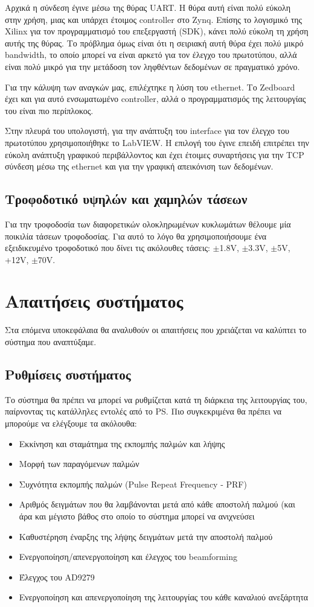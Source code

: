 \documentclass[12pt,a4paper]{book}
\begin{document}
Αρχικά η σύνδεση έγινε μέσω της θύρας UART. Η θύρα αυτή είναι πολύ εύκολη στην χρήση, μιας και υπάρχει έτοιμος controller στο Zynq. Επίσης το λογισμικό της Xilinx για τον προγραμματισμό του επεξεργαστή (SDK), κάνει πολύ εύκολη τη χρήση αυτής της θύρας. Το πρόβλημα όμως είναι ότι η σειριακή αυτή θύρα έχει πολύ μικρό bandwidth, το οποίο μπορεί να είναι αρκετό για τον έλεγχο του πρωτοτύπου, αλλά είναι πολύ μικρό για την μετάδοση τον ληφθέντων δεδομένων σε πραγματικό χρόνο.

Για την κάλυψη των αναγκών μας, επιλέχτηκε η λύση του ethernet. Το Zedboard έχει και για αυτό ενσωματωμένο controller, αλλά ο προγραμματισμός της λειτουργίας του είναι πιο περίπλοκος. 

Στην πλευρά του υπολογιστή, για την ανάπτυξη του interface για τον έλεγχο του πρωτοτύπου χρησιμοποιήθηκε το LabVIEW. Η επιλογή του έγινε επειδή επιτρέπει την εύκολη ανάπτυξη γραφικού περιβάλλοντος και έχει έτοιμες συναρτήσεις για την TCP σύνδεση μέσω της ethernet και για την γραφική απεικόνιση των δεδομένων.

\subsection{Τροφοδοτικό υψηλών και χαμηλών τάσεων}
Για την τροφοδοσία των διαφορετικών ολοκληρωμένων κυκλωμάτων θέλουμε μία ποικιλία τάσεων τροφοδοσίας. Για αυτό το λόγο θα χρησιμοποιήσουμε ένα εξειδικευμένο τροφοδοτικό που δίνει τις ακόλουθες τάσεις: $ \pm $1.8V,  $ \pm $3.3V, $ \pm $5V,  +12V, $ \pm $70V.


\section{Απαιτήσεις συστήματος}
Στα επόμενα υποκεφάλαια θα αναλυθούν οι απαιτήσεις που χρειάζεται να καλύπτει το σύστημα που αναπτύξαμε.


\subsection{Ρυθμίσεις συστήματος}
Το σύστημα θα πρέπει να μπορεί να ρυθμίζεται κατά τη διάρκεια της λειτουργίας του, παίρνοντας τις κατάλληλες εντολές από το PS. Πιο συγκεκριμένα θα πρέπει να μπορούμε να ελέγξουμε τα ακόλουθα:
\begin{itemize}
\item Εκκίνηση και σταμάτημα της εκπομπής παλμών και λήψης
\item Μορφή των παραγόμενων παλμών
\item Συχνότητα εκπομπής παλμών (Pulse Repeat Frequency - PRF)
\item Αριθμός δειγμάτων που θα λαμβάνονται μετά από κάθε αποστολή παλμού (και άρα και μέγιστο βάθος στο οποίο το σύστημα μπορεί να ανιχνεύσει
\item Καθυστέρηση έναρξης της λήψης δειγμάτων μετά την αποστολή παλμού
\item Ενεργοποίηση/απενεργοποίηση και έλεγχος του beamforming
\item Έλεγχος του AD9279
\item Ενεργοποίηση και απενεργοποίηση της λειτουργίας του κάθε καναλιού ανεξάρτητα
\end{itemize}
\end{document}
